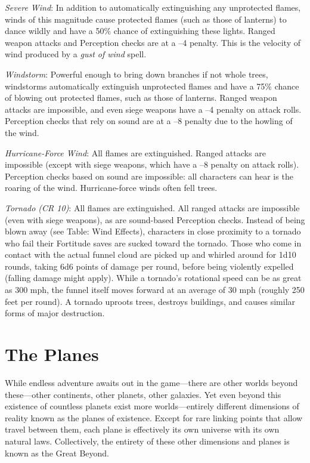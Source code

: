\textit{Severe Wind}: In addition to automatically extinguishing any unprotected flames, winds of this magnitude cause protected flames (such as those of lanterns) to dance wildly and have a 50\% chance of extinguishing these lights. Ranged weapon attacks and Perception checks are at a --4 penalty. This is the velocity of wind produced by a \textit{gust of wind }spell.
				
\textit{Windstorm}: Powerful enough to bring down branches if not whole trees, windstorms automatically extinguish unprotected flames and have a 75\% chance of blowing out protected flames, such as those of lanterns. Ranged weapon attacks are impossible, and even siege weapons have a --4 penalty on attack rolls. Perception checks that rely on sound are at a --8 penalty due to the howling of the wind. 
				
\textit{Hurricane-Force Wind}: All flames are extinguished. Ranged attacks are impossible (except with siege weapons, which have a --8 penalty on attack rolls). Perception checks based on sound are impossible: all characters can hear is the roaring of the wind. Hurricane-force winds often fell trees.
				
\textit{Tornado (CR 10)}: All flames are extinguished. All ranged attacks are impossible (even with siege weapons), as are sound-based Perception checks. Instead of being blown away (see Table: Wind Effects), characters in close proximity to a tornado who fail their Fortitude saves are sucked toward the tornado. Those who come in contact with the actual funnel cloud are picked up and whirled around for 1d10 rounds, taking 6d6 points of damage per round, before being violently expelled (falling damage might apply). While a tornado's rotational speed can be as great as 300 mph, the funnel itself moves forward at an average of 30 mph (roughly 250 feet per round). A tornado uproots trees, destroys buildings, and causes similar forms of major destruction.
				
\section{The Planes}

				
While endless adventure awaits out in the game---there are other worlds beyond these---other continents, other planets, other galaxies. Yet even beyond this existence of countless planets exist more worlds---entirely different dimensions of reality known as the planes of existence. Except for rare linking points that allow travel between them, each plane is effectively its own universe with its own natural laws. Collectively, the entirety of these other dimensions and planes is known as the Great Beyond.
				
